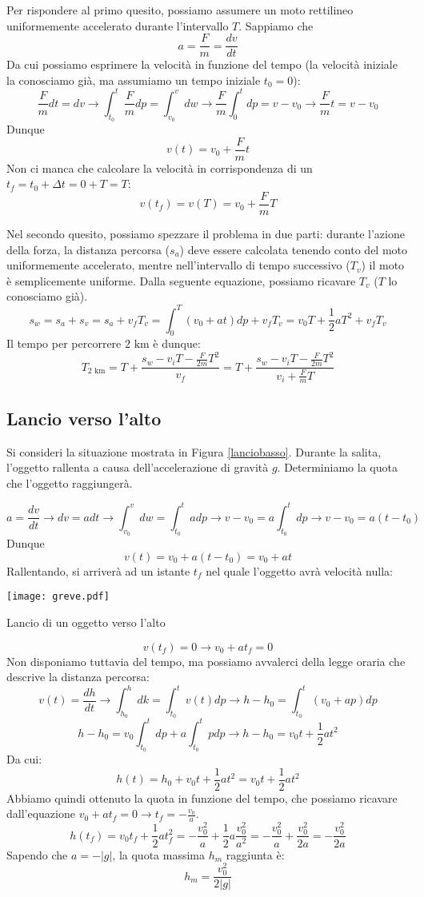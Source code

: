 Per rispondere al primo quesito, possiamo assumere un moto rettilineo
uniformemente accelerato durante l'intervallo $T$. Sappiamo che \[ a = \frac{F}{m} = \frac{dv}{dt} \]
Da cui possiamo esprimere la velocità in funzione del tempo (la velocità
iniziale la conosciamo già, ma assumiamo un tempo iniziale $t_0 = 0$):
\[ \frac{F}{m}dt = dv \to \int_{t_0}^{t}\frac{F}{m}dp = \int_{v_0}^{v}dw \to \frac{F}{m}\int_{0}^{t}dp = v - v_0 \to \frac{F}{m}t = v - v_0 \]
Dunque
\[ v(t) = v_0 + \frac{F}{m}t \]
Non ci manca che calcolare la velocità in corrispondenza di un $t_f = t_0 + \Delta t = 0 + T = T$:
\[ v(t_f) = v(T) = v_0 + \frac{F}{m}T \]

Nel secondo quesito, possiamo spezzare il problema in due parti: durante
l'azione della forza, la distanza percorsa ($s_a$) deve essere calcolata tenendo
conto del moto uniformemente accelerato, mentre nell'intervallo di tempo
successivo ($T_v$) il moto è semplicemente uniforme. Dalla seguente equazione,
possiamo ricavare $T_v$ ($T$ lo conosciamo già).
\[ s_w = s_a + s_v = s_a + v_fT_v = \int_{0}^{T}(v_0 + at)dp + v_fT_v = v_0T + \frac{1}{2}aT^2 + v_fT_v \]
Il tempo per percorrere $2\text{ km}$ è dunque:
\[ T_{2\text{ km}} = T + \frac{s_w - v_iT - \frac{F}{2m}T^2}{v_f} = T + \frac{s_w - v_iT - \frac{F}{2m}T^2}{v_i + \frac{F}{m}T} \]

\subsection*{Lancio verso l'alto}
Si consideri la situazione mostrata in Figura \ref{lanciobasso}.
Durante la salita, l'oggetto rallenta a causa dell'accelerazione di gravità $g$.
Determiniamo la quota che l'oggetto raggiungerà.

\[ a = \frac{dv}{dt} \to dv = adt \to \int_{v_0}^{v}dw = \int_{t_0}^{t}adp \to v - v_0 = a\int_{t_0}^{t}dp \to v - v_0 = a(t - t_0) \]
Dunque
\[ v(t) = v_0 + a(t - t_0) = v_0 + at \]
Rallentando, si arriverà ad un istante $t_f$ nel quale l'oggetto avrà velocità
nulla:
\begin{marginfigure}
    \centering
    \texttt{[image: greve.pdf]}
    \caption{Lancio di un oggetto verso l'alto}
    \label{lanciobasso}
\end{marginfigure}
\[ v(t_f) = 0 \to v_0 + at_f = 0 \]
Non disponiamo tuttavia del tempo, ma possiamo avvalerci della legge oraria
che descrive la distanza percorsa:
\[ v(t) = \frac{dh}{dt} \to \int_{h_0}^{h}dk = \int_{t_0}^{t}v(t)dp \to h - h_0 = \int_{t_0}^{t}(v_0 + ap)dp \]
\[ h - h_0 = v_0\int_{t_0}^{t}dp + a\int_{t_0}^{t}pdp \to h - h_0 = v_0t + \frac12 at^2 \]
Da cui:
\[ h(t) = h_0 + v_0t + \frac12 at^2 = v_0t + \frac12 at^2 \]
Abbiamo quindi ottenuto la quota in funzione del tempo, che possiamo ricavare
dall'equazione $v_0 + at_f = 0 \to t_f = -\frac{v_0}{a}$.
\[ h(t_f) = v_0t_f + \frac12 at_{f}^2 =  -\frac{v_0^2}{a} + \frac{1}{2}a\frac{v_0^2}{a^2} = -\frac{v_0^2}{a} + \frac{v_0^2}{2a} = -\frac{v_0^2}{2a} \]
Sapendo che $a = -|g|$, la quota massima $h_m$ raggiunta è:
\[ h_m = \frac{v_0^2}{2|g|} \]

